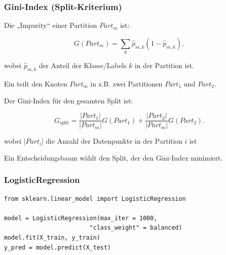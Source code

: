 \subsubsection{Gini-Index (Split-Kriterium)}
\begin{contentbox}

Die „Impurity“ einer Partition $Part_m$ ist:

\begin{equation}
G(Part_m) = \sum_{k} \hat{p}_{m,k} (1 - \hat{p}_{m,k}),
\end{equation}

wobei $\hat{p}_{m,k}$ der Anteil der Klasse/Labels $k$ in der Partition ist.



Ein  teilt den Knoten $Part_m$ in z.B. zwei Partitionen $Part_1$ und $Part_2$.

Der Gini-Index für den gesamten Split ist:

\begin{equation}
G_{\text{split}} =
\frac{|Part_1|}{|Part_m|} G(Part_1)
+ \frac{|Part_2|}{|Part_m|} G(Part_2).
\end{equation}

wobei $|Part_i|$ die Anzahl der Datenpunkte in der Partition $i$ ist
\end{contentbox}

\begin{statementbox}[Hinweis]
Ein Entscheidungsbaum wählt den Split, der den Gini-Index minimiert.
\end{statementbox}
\subsubsection{LogisticRegression}
\begin{contentbox}
\begin{factlist}
\end{factlist}
\end{contentbox}
\begin{codebox}
\begin{lstlisting}[style=CodeExpert]
from sklearn.linear_model import LogisticRegression

model = LogisticRegression(max_iter = 1000,
                        "class_weight" = balanced)
model.fit(X_train, y_train)
y_pred = model.predict(X_test)
\end{lstlisting}
\end{codebox}

